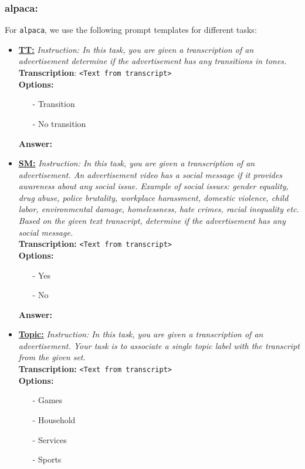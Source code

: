 \subsubsection{alpaca:} 
For \texttt{alpaca}, we use the following prompt templates for different tasks:

\begin{itemize}
    \item \textbf{\underline{TT:}} \textit{Instruction: In this task, you are given a transcription of an advertisement determine if the advertisement has any transitions in tones.}\\
\textbf{Transcription}: \texttt{<Text from transcript>}\\
\textbf{Options:}
\begin{itemize}
\item[-] Transition
\item[-] No transition
\end{itemize}
\textbf{Answer:}
\item \textbf{\underline{SM:}} \textit{Instruction: In this task, you are given a transcription of an advertisement. An advertisement video has a social message if it provides awareness about any social issue. Example of social issues: gender equality, drug abuse, police brutality, workplace harassment, domestic violence, child labor, environmental damage, homelessness, hate crimes, racial inequality etc. Based on the given text transcript, determine if the advertisement has any social message. }\\
    \textbf{Transcription:} \texttt{<Text from transcript>}\\
\textbf{Options:}
\begin{itemize}
\item[-] Yes
\item[-] No
\end{itemize}
\textbf{Answer:}
\item \textbf{\underline{Topic:}} \textit{Instruction: In this task, you are given a transcription of an advertisement. Your task is to associate a single topic label with the transcript from the given set.}\\
\textbf{Transcription:} \texttt{<Text from transcript>}\\
\textbf{Options:}
    \begin{itemize}
    \item [-] Games
    \item [-] Household
    \item [-] Services
    \item [-] Sports 

\end{itemize}
\end{itemize}
